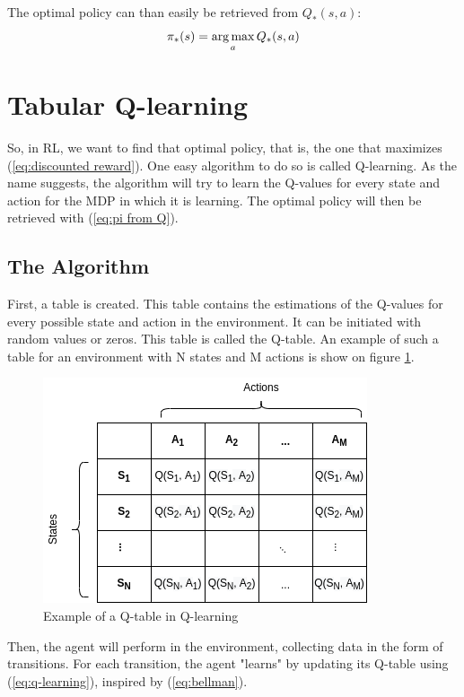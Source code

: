 The optimal policy can than easily be retrieved from $Q_*(s,a)$:
\begin{equation} \label{eq:pi from Q}
    \pi_*(s) = \operatorname*{arg\,max}_a Q_*(s,a)
\end{equation}


\section{Tabular Q-learning}

So, in RL, we want to find that optimal policy, that is, the one that maximizes (\ref{eq:discounted reward}). One easy algorithm to do so is called Q-learning. As the name suggests, the algorithm will try to learn the Q-values for every state and action for the MDP in which it is learning. The optimal policy will then be retrieved with (\ref{eq:pi from Q}).\\

\subsection{The Algorithm} \label{sec:Q-learning}

First, a table is created. This table contains the estimations of the Q-values for every possible state and action in the environment. It can be initiated with random values or zeros. This table is called the Q-table. An example of such a table for an environment with N states and M actions is show on figure \ref{fig:Q-table}.\\

\begin{figure}
    \centering
    \includegraphics[width=.55\textwidth]{images/Q-table.png}
    \caption{Example of a Q-table in Q-learning \cite{Q-learning}}
    \label{fig:Q-table}
\end{figure}

Then, the agent will perform in the environment, collecting data in the form of transitions. For each transition, the agent "learns" by updating its Q-table using (\ref{eq:q-learning}), inspired by (\ref{eq:bellman}).

